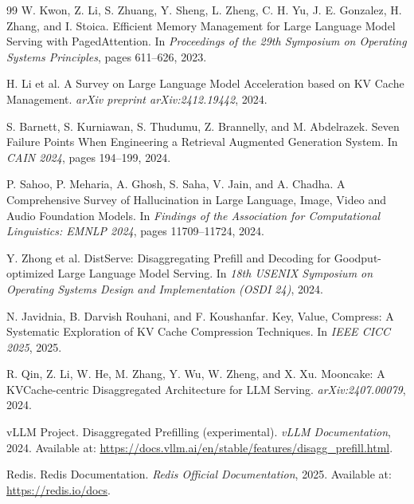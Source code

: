 \documentclass[12pt,a4paper]{article}
\begin{document}
\begin{thebibliography}{99}
W. Kwon, Z. Li, S. Zhuang, Y. Sheng, L. Zheng, C. H. Yu, J. E. Gonzalez, H. Zhang, and I. Stoica. Efficient Memory Management for Large Language Model Serving with PagedAttention. In \textit{Proceedings of the 29th Symposium on Operating Systems Principles}, pages 611--626, 2023.

H. Li et al. A Survey on Large Language Model Acceleration based on KV Cache Management. \textit{arXiv preprint arXiv:2412.19442}, 2024.

S. Barnett, S. Kurniawan, S. Thudumu, Z. Brannelly, and M. Abdelrazek. Seven Failure Points When Engineering a Retrieval Augmented Generation System. In \textit{CAIN 2024}, pages 194--199, 2024.

P. Sahoo, P. Meharia, A. Ghosh, S. Saha, V. Jain, and A. Chadha. A Comprehensive Survey of Hallucination in Large Language, Image, Video and Audio Foundation Models. In \textit{Findings of the Association for Computational Linguistics: EMNLP 2024}, pages 11709--11724, 2024.

Y. Zhong et al. DistServe: Disaggregating Prefill and Decoding for Goodput-optimized Large Language Model Serving. In \textit{18th USENIX Symposium on Operating Systems Design and Implementation (OSDI 24)}, 2024.

N. Javidnia, B. Darvish Rouhani, and F. Koushanfar. Key, Value, Compress: A Systematic Exploration of KV Cache Compression Techniques. In \textit{IEEE CICC 2025}, 2025.

R. Qin, Z. Li, W. He, M. Zhang, Y. Wu, W. Zheng, and X. Xu. Mooncake: A KVCache-centric Disaggregated Architecture for LLM Serving. \textit{arXiv:2407.00079}, 2024.

vLLM Project. Disaggregated Prefilling (experimental). \textit{vLLM Documentation}, 2024. Available at: \url{https://docs.vllm.ai/en/stable/features/disagg_prefill.html}.

Redis. Redis Documentation. \textit{Redis Official Documentation}, 2025. Available at: \url{https://redis.io/docs}.

\end{thebibliography}
\end{document}
